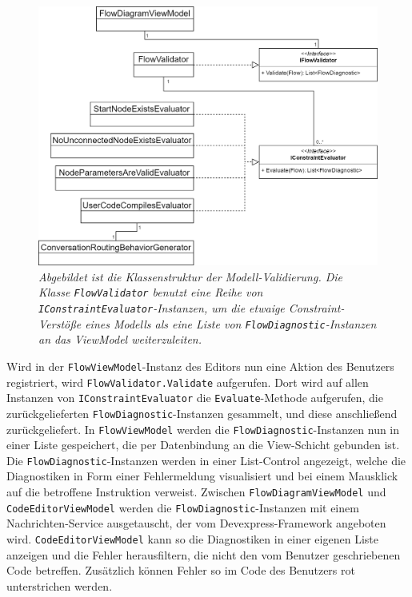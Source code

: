 \begin{figure} %
	\centering
		\includegraphics[width=\textwidth]{img/FlowValidatorClassStructure.png}
	\caption[Klassenstruktur der Modell-Validierung]{\textit{Abgebildet ist die Klassenstruktur der Modell-Validierung. Die Klasse \texttt{FlowValidator} benutzt eine Reihe von \texttt{IConstraintEvaluator}-Instanzen, um die etwaige Constraint-Verstöße eines Modells als eine Liste von \texttt{FlowDiagnostic}-Instanzen an das ViewModel weiterzuleiten.}}
	\label{fig:UML:FlowValidatorClassStructure}
\end{figure}
\noindent 
\newpage
Wird in der \texttt{FlowViewModel}-Instanz des Editors nun eine Aktion des Benutzers registriert, wird \texttt{FlowValidator.Validate} aufgerufen. Dort wird auf allen Instanzen von \texttt{IConstraintEvaluator} die \texttt{Evaluate}-Methode aufgerufen, die zurückgelieferten \texttt{FlowDiagnostic}-Instanzen gesammelt, und diese anschließend zurückgeliefert. In \texttt{FlowViewModel} werden die \texttt{FlowDiagnostic}-Instanzen nun in einer Liste gespeichert, die per Datenbindung an die View-Schicht gebunden ist. Die \texttt{FlowDiagnostic}-Instanzen werden in einer List-Control angezeigt, welche die Diagnostiken in Form einer Fehlermeldung visualisiert und bei einem Mausklick auf die betroffene Instruktion verweist. Zwischen \texttt{FlowDiagramViewModel} und \texttt{Code\-Edi\-tor\-View\-Mo\-del} werden die \texttt{FlowDiagnostic}-Instanzen mit einem Nachrichten-Service ausgetauscht, der vom Devexpress-Framework angeboten wird. \texttt{Code\-Edi\-tor\-View\-Mo\-del} kann so die Diagnostiken in einer eigenen Liste anzeigen und die Fehler herausfiltern, die nicht den vom Benutzer geschriebenen Code betreffen. Zusätzlich können Fehler so im Code des Benutzers rot unterstrichen werden.